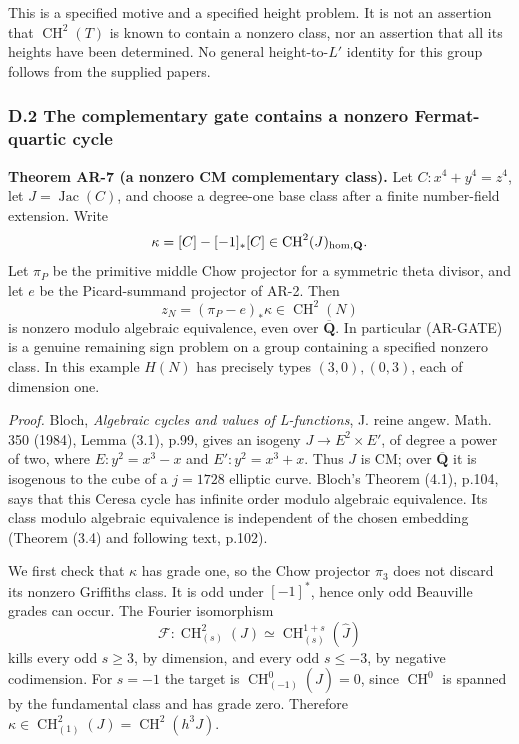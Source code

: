 \documentclass[11pt,a4paper]{article}
\begin{document}
This is a specified motive and a specified height problem. It is not an
assertion that \(\operatorname{CH}^2(T)\) is known to contain a nonzero
class, nor an assertion that all its heights have been determined. No
general height-to-\(L'\) identity for this group follows from the
supplied papers.

\subsubsection{D.2 The complementary gate contains a nonzero
Fermat-quartic
cycle}\label{d.2-the-complementary-gate-contains-a-nonzero-fermat-quartic-cycle}

\textbf{Theorem AR-7 (a nonzero CM complementary class).} Let
\(C:x^4+y^4=z^4\), let \(J=\operatorname{Jac}(C)\), and choose a
degree-one base class after a finite number-field extension. Write \[
\kappa=[C]-[-1]_*[C]\in\operatorname{CH}^2(J)_{\rm hom,\mathbf Q}.
\] Let \(\pi_P\) be the primitive middle Chow projector for a symmetric
theta divisor, and let \(e\) be the Picard-summand projector of AR-2.
Then \[
z_N=(\pi_P-e)_*\kappa\in\operatorname{CH}^2(N)
\tag{AR.9}
\] is nonzero modulo algebraic equivalence, even over
\(\overline{\mathbf Q}\). In particular (AR-GATE) is a genuine remaining
sign problem on a group containing a specified nonzero class. In this
example \(H(N)\) has precisely types \((3,0),(0,3)\), each of dimension
one.

\emph{Proof.} Bloch, \emph{Algebraic cycles and values of L-functions},
J. reine angew. Math. 350 (1984), Lemma (3.1), p.99, gives an isogeny
\(J\to E^2\times E'\), of degree a power of two, where \(E:y^2=x^3-x\)
and \(E':y^2=x^3+x\). Thus \(J\) is CM; over \(\overline{\mathbf Q}\) it
is isogenous to the cube of a \(j=1728\) elliptic curve. Bloch's Theorem
(4.1), p.104, says that this Ceresa cycle has infinite order modulo
algebraic equivalence. Its class modulo algebraic equivalence is
independent of the chosen embedding (Theorem (3.4) and following text,
p.102).

We first check that \(\kappa\) has grade one, so the Chow projector
\(\pi_3\) does not discard its nonzero Griffiths class. It is odd under
\([-1]^*\), hence only odd Beauville grades can occur. The Fourier
isomorphism \[
\mathcal F:\operatorname{CH}^2_{(s)}(J)
 \simeq\operatorname{CH}^{1+s}_{(s)}(\widehat J)
\] kills every odd \(s\ge3\), by dimension, and every odd \(s\le-3\), by
negative codimension. For \(s=-1\) the target is
\(\operatorname{CH}^0_{(-1)}(\widehat J)=0\), since
\(\operatorname{CH}^0\) is spanned by the fundamental class and has
grade zero. Therefore
\(\kappa\in\operatorname{CH}^2_{(1)}(J)=\operatorname{CH}^2(h^3J)\).
\end{document}
